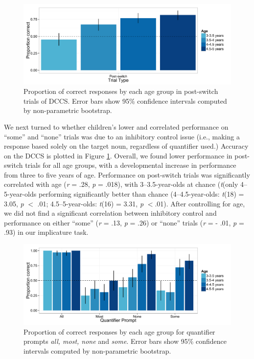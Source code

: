 \documentclass[man]{apa2}
\begin{document}

\begin{figure} 
 \begin{center} 
  \includegraphics[scale=.5]{figures/DCCS.pdf} 
  \caption{\label{fig:exp3_DCCS} Proportion of correct responses by each age group in post-switch trials of DCCS. Error bars show 95\% confidence intervals computed by non-parametric bootstrap.} 
 \end{center} 
\end{figure}

We next turned to whether children's lower and correlated performance on ``some'' and ``none'' trials was due to an inhibitory control issue (i.e., making a response based solely on the target noun, regardless of quantifier used.) Accuracy on the DCCS is plotted in Figure \ref{fig:exp3_DCCS}. Overall, we found lower performance in post-switch trials for all age groups, with a developmental increase in performance from three to five years of age. Performance on post-switch trials was significantly correlated with age (\textit{r} = .28, \textit{p} = .018), with 3--3.5-year-olds at chance (\emph{t}(only 4--5-year-olds performing significantly better than chance (4--4.5-year-olds: \emph{t}(18) = 3.05, \emph{p} $<$ .01; 4.5--5-year-olds: \emph{t}(16) = 3.31, \emph{p} $< $.01). After controlling for age, we did not find a significant correlation between inhibitory control and performance on either ``some'' (\textit{r} = .13, \textit{p} = .26) or ``none'' trials (\textit{r} = - .01, \textit{p} = .93) in our implicature task.

\begin{figure} 
 \begin{center} 
  \includegraphics[scale=.5]{figures/exp3_GQright.pdf} 
  \caption{\label{fig:exp3_GQright} Proportion of correct responses by each age group for quantifier prompts \textit{all, most, none} and \textit{some}. Error bars show 95\% confidence intervals computed by non-parametric bootstrap.} 
 \end{center} 
\end{figure}
\end{document}
